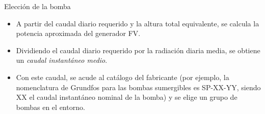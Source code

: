 \documentclass[xcolor={usenames,svgnames,dvipsnames}]{beamer}
\begin{document}
\begin{frame}[label=sec-4-1]{Elección de la bomba}
\begin{itemize}
\item A partir del caudal diario requerido y la altura total equivalente, se calcula la potencia aproximada del generador FV.

\item Dividiendo el caudal diario requerido por la radiación diaria media, se obtiene un \emph{caudal instantáneo medio}.

\item Con este caudal, se acude al catálogo del fabricante (por ejemplo, la nomenclatura de Grundfos para las bombas sumergibles es SP-XX-YY, siendo XX el caudal instantáneo nominal de la bomba) y se elige un grupo de bombas en el entorno.
\end{itemize}
\end{frame}
\end{document}
